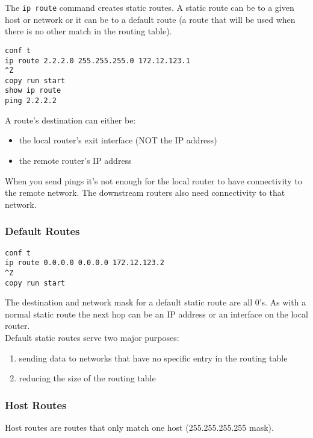 The \texttt{ip route} command creates static routes. A static route can
be to a given host or network or it can be to a default route (a route that
will be used when there is no other match in the routing table).

\begin{verbatim}
conf t
ip route 2.2.2.0 255.255.255.0 172.12.123.1
^Z
copy run start
show ip route
ping 2.2.2.2
\end{verbatim}

A route's destination can either be:

\begin{itemize}
\item the local router's exit interface (NOT the IP address)
\item the remote router's IP address
\end{itemize}

When you send pings it's not enough for the local router to have connectivity
to the remote network. The downstream routers also need connectivity to that
network.

\subsubsection{Default Routes}

\begin{verbatim}
conf t
ip route 0.0.0.0 0.0.0.0 172.12.123.2
^Z
copy run start
\end{verbatim}

The destination and network mask for a default static route are all 0's.
As with a normal static route the next hop can be an IP address or an
interface on the local router.\\

Default static routes serve two major purposes:

\begin{enumerate}
\item sending data to networks that have no specific entry in the routing
table
\item reducing the size of the routing table
\end{enumerate}

\subsubsection{Host Routes}

Host routes are routes that only match one host (255.255.255.255 mask).

